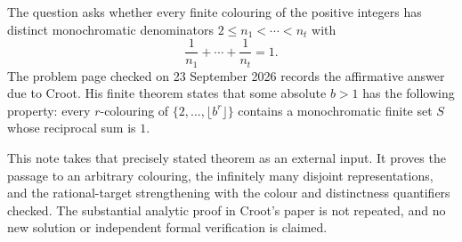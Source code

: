 The question asks whether every finite colouring of the positive
integers has distinct monochromatic denominators
$2\leq n_1<\cdots<n_t$ with
\[
 \frac1{n_1}+\cdots+\frac1{n_t}=1.
\]
The problem page checked on 23 September 2026 records the affirmative
answer due to Croot. His finite theorem states that some absolute
$b>1$ has the following property: every $r$-colouring of
$\{2,\ldots,\lfloor b^r\rfloor\}$ contains a monochromatic finite
set $S$ whose reciprocal sum is $1$.

This note takes that precisely stated theorem as an external input.
It proves the passage to an arbitrary colouring, the infinitely many
disjoint representations, and the rational-target strengthening with
the colour and distinctness quantifiers checked. The substantial
analytic proof in Croot's paper is not repeated, and no new solution
or independent formal verification is claimed.
